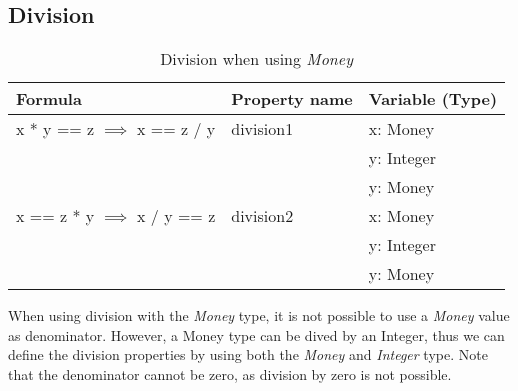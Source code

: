 \subsection*{Division}
\FloatBarrier
\begin{table}[!ht]
\centering
\begin{tabular}{lll}
\hline
                        \textbf{Formula}                 & \textbf{Property name} & \textbf{Variable (Type)} \\ \hline
\rowcolor[HTML]{EFEFEF} x * y == z $\implies$ x == z / y & division1              & x: Money                 \\
\rowcolor[HTML]{EFEFEF}                                  &                        & y: Integer               \\
\rowcolor[HTML]{EFEFEF}                                  &                        & y: Money                 \\
                        x == z * y $\implies$ x / y == z & division2              & x: Money                 \\
                                                         &                        & y: Integer               \\
                                                         &                        & y: Money                 \\ \hline
\end{tabular}
\caption{Division when using \textit{Money}}
\label{tbl:ch4_money_division}
\end{table}
\FloatBarrier
When using division with the \textit{Money} type, it is not possible to use a \textit{Money} value as denominator. However, a Money type can be dived by an Integer, thus we can define the division properties by using both the \textit{Money} and \textit{Integer} type. Note that the denominator cannot be zero, as division by zero is not possible. %

